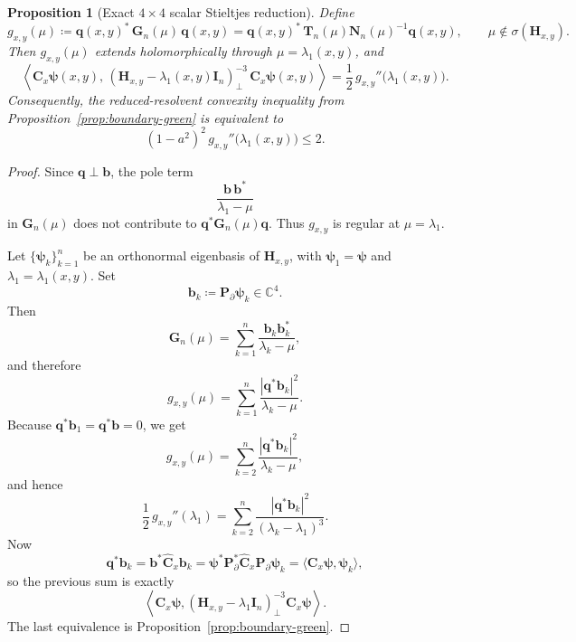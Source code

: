 \documentclass[11pt]{article}
\newtheorem{proposition}[theorem]{Proposition}
\begin{document}
\begin{proposition}[Exact \(4\times4\) scalar Stieltjes reduction]\label{prop:4x4-stieltjes}
Define
\[
g_{x,y}(\mu)\coloneqq
\mathbf q(x,y)^*\,\mathbf G_n(\mu)\,\mathbf q(x,y)
=
\mathbf q(x,y)^*\,\mathbf T_n(\mu)\mathbf N_n(\mu)^{-1}\mathbf q(x,y),
\qquad
\mu\notin\sigma(\mathbf H_{x,y}).
\]
Then \(g_{x,y}(\mu)\) extends holomorphically through \(\mu=\lambda_1(x,y)\), and
\[
\boxed{
\left\langle
\mathbf C_x\boldsymbol{\psi}(x,y),\,
(\mathbf H_{x,y}-\lambda_1(x,y)\mathbf I_n)^{-3}_{\perp}\,
\mathbf C_x\boldsymbol{\psi}(x,y)
\right\rangle
=
\frac12\,g_{x,y}''\bigl(\lambda_1(x,y)\bigr).
}
\]
Consequently, the reduced-resolvent convexity inequality from Proposition~\ref{prop:boundary-green} is equivalent to
\[
\boxed{
(1-a^2)^2\,g_{x,y}''\bigl(\lambda_1(x,y)\bigr)\le 2.
}
\]
\end{proposition}

\begin{proof}
Since \(\mathbf q\perp \mathbf b\), the pole term
\[
\frac{\mathbf b\,\mathbf b^*}{\lambda_1-\mu}
\]
in \(\mathbf G_n(\mu)\) does not contribute to \(\mathbf q^*\mathbf G_n(\mu)\mathbf q\). Thus \(g_{x,y}\) is regular at \(\mu=\lambda_1\).

Let \(\{\boldsymbol{\psi}_k\}_{k=1}^n\) be an orthonormal eigenbasis of \(\mathbf H_{x,y}\), with
\(\boldsymbol{\psi}_1=\boldsymbol{\psi}\) and \(\lambda_1=\lambda_1(x,y)\). Set
\[
\mathbf b_k\coloneqq \mathbf P_\partial \boldsymbol{\psi}_k\in\mathbb C^4.
\]
Then
\[
\mathbf G_n(\mu)
=
\sum_{k=1}^n \frac{\mathbf b_k\mathbf b_k^*}{\lambda_k-\mu},
\]
and therefore
\[
g_{x,y}(\mu)
=
\sum_{k=1}^n \frac{|\mathbf q^*\mathbf b_k|^2}{\lambda_k-\mu}.
\]
Because \(\mathbf q^*\mathbf b_1=\mathbf q^*\mathbf b=0\), we get
\[
g_{x,y}(\mu)
=
\sum_{k=2}^n \frac{|\mathbf q^*\mathbf b_k|^2}{\lambda_k-\mu},
\]
and hence
\[
\frac12\,g_{x,y}''(\lambda_1)
=
\sum_{k=2}^n
\frac{|\mathbf q^*\mathbf b_k|^2}{(\lambda_k-\lambda_1)^3}.
\]
Now
\[
\mathbf q^*\mathbf b_k
=
\mathbf b^*\widehat{\mathbf C}_x \mathbf b_k
=
\boldsymbol{\psi}^* \mathbf P_\partial^* \widehat{\mathbf C}_x \mathbf P_\partial \boldsymbol{\psi}_k
=
\langle \mathbf C_x\boldsymbol{\psi},\boldsymbol{\psi}_k\rangle,
\]
so the previous sum is exactly
\[
\left\langle
\mathbf C_x\boldsymbol{\psi},
(\mathbf H_{x,y}-\lambda_1\mathbf I_n)^{-3}_{\perp}
\mathbf C_x\boldsymbol{\psi}
\right\rangle.
\]
The last equivalence is Proposition~\ref{prop:boundary-green}.
\end{proof}
\end{document}
